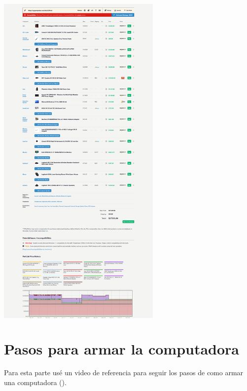 \documentclass[12pt, a4paper, twocolumn]{article}
\begin{document}
\includegraphics[width=0.6\textwidth]{Maximum.png} \\
\twocolumn
\section{Pasos para armar la computadora}
Para esta parte usé un video de referencia para seguir los pasos de como armar una computadora (\cite{linusTechTips_pcbuilding}).

\newpage
\onecolumn
\printbibliography
\end{document}
